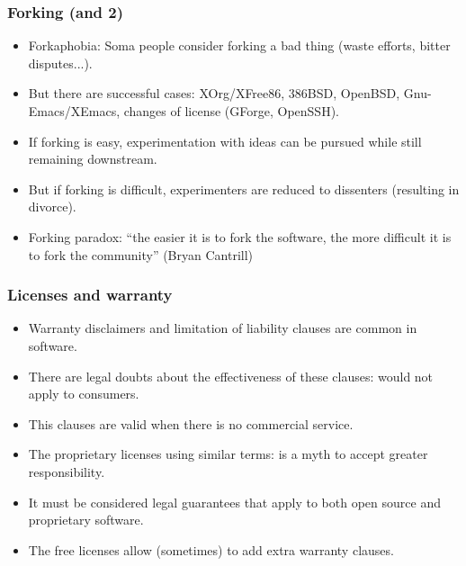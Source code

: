 \documentclass{beamer}
\begin{document}
\begin{frame}
\frametitle{Forking (and 2)}

\begin{itemize}
\item \alert{Forkaphobia}: Soma people consider forking a bad thing (waste efforts, bitter disputes...).
\item But there are successful cases: XOrg/XFree86, 386BSD, OpenBSD, Gnu-Emacs/XEmacs, changes of license (GForge, OpenSSH).
\item If forking is easy, experimentation with ideas can be pursued while still remaining downstream.
\item But if forking is difficult, experimenters are reduced to dissenters (resulting in divorce). 
\item \alert{Forking paradox}: ``the easier it is to fork the software, the more difficult it is to fork the community'' (Bryan Cantrill)
\end{itemize}

\end{frame}



\begin{frame}
\frametitle{Licenses and warranty}

\begin{itemize}
\item Warranty disclaimers and limitation of liability clauses are common in software.
\item There are legal doubts about the effectiveness of these clauses: \alert{would not apply to consumers}.
\item This clauses are valid when there is \alert{no commercial service}.
\item The proprietary licenses using similar terms: is a myth to accept greater responsibility.
\item It must be considered legal guarantees that apply to both open source and proprietary software.
\item The free licenses allow (sometimes) to add extra warranty clauses.
\end{itemize}


\end{frame}

\end{document}

